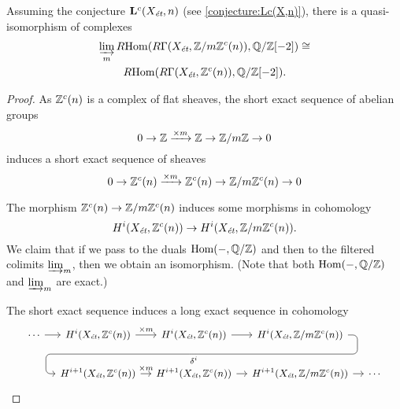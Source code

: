 \begin{proposition}
  \label{prop:a-quasi-isomorphism-with-dirlim}
  Assuming the conjecture $\mathbf{L}^c (X_\text{\it ét}, n)$
  (see \ref{conjecture:Lc(X,n)}), there is a quasi-isomorphism of complexes
  \begin{multline*}
    \varinjlim_m R\!\operatorname{Hom} (R\Gamma (X_\text{\it ét}, \mathbb{Z}/m\mathbb{Z}^c (n)), \mathbb{Q}/\mathbb{Z} [-2]) \cong \\
    R\!\operatorname{Hom} (R\Gamma (X_\text{\it ét}, \mathbb{Z}^c (n)), \mathbb{Q}/\mathbb{Z} [-2]).
  \end{multline*}
\end{proposition}

\begin{proof}
  As $\mathbb{Z}^c (n)$ is a complex of flat sheaves, the short exact sequence of
  abelian groups
  $$0 \to \mathbb{Z} \xrightarrow{\times m} \mathbb{Z} \to \mathbb{Z}/m\mathbb{Z} \to 0$$
  induces a short exact sequence of sheaves
  \begin{equation}
    \label{short-exact-sequence-with-Z/m}
    0 \to \mathbb{Z}^c (n) \xrightarrow{\times m} \mathbb{Z}^c (n) \to \mathbb{Z}/m\mathbb{Z}^c (n) \to 0
  \end{equation}

  The morphism $\mathbb{Z}^c (n) \to \mathbb{Z}/m\mathbb{Z}^c (n)$ induces some morphisms in
  cohomology
  $$H^i (X_\text{\it ét}, \mathbb{Z}^c (n)) \to H^i (X_\text{\it ét}, \mathbb{Z}/m\mathbb{Z}^c (n)).$$
  We claim that if we pass to the duals $\operatorname{Hom} (-, \mathbb{Q}/\mathbb{Z})$ and then to the
  filtered colimits $\varinjlim_m$, then we obtain an isomorphism. (Note that both
  $\operatorname{Hom} (-, \mathbb{Q}/\mathbb{Z})$ and $\varinjlim_m$ are exact.)

  The short exact sequence  induces a long
  exact sequence in cohomology
  \[ \begin{tikzcd}[column sep=1em,font=\small]
      \cdots\ar{r} & H^i (X_\text{\it ét}, \ZZ^c (n)) \ar{r}{\times m} & H^i (X_\text{\it ét}, \ZZ^c (n))\ar{r} \ar[draw=none]{d}[name=X, anchor=center]{} & H^i (X_\text{\it ét}, \ZZ/m\ZZ^c (n)) \ar[rounded corners,to path={ -- ([xshift=2ex]\tikztostart.east) |- (X.center) \tikztonodes -| ([xshift=-2ex]\tikztotarget.west) -- (\tikztotarget)}]{dll}[at end]{\delta^i} \\
      & H^{i+1} (X_\text{\it ét}, \ZZ^c (n)) \ar{r}{\times m} & H^{i+1} (X_\text{\it ét}, \ZZ^c (n))\ar{r} & H^{i+1} (X_\text{\it ét}, \ZZ/m\ZZ^c (n)) \ar{r} & \cdots
    \end{tikzcd} \]


\end{proof}
